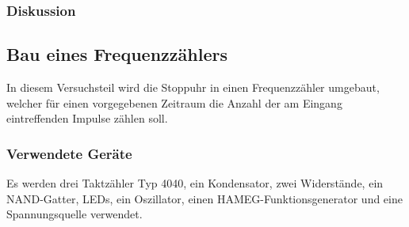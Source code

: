 \documentclass[12pt,a4paper]{article}
\begin{document}
\subsubsection*{Diskussion}





\subsection{Bau eines Frequenzzählers}
In diesem Versuchsteil wird die Stoppuhr in einen Frequenzzähler umgebaut, welcher für einen vorgegebenen Zeitraum die Anzahl der am Eingang eintreffenden Impulse zählen soll.
\subsubsection*{Verwendete Geräte}
Es werden drei Taktzähler Typ 4040, ein Kondensator, zwei Widerstände, ein NAND-Gatter, LEDs, ein Oszillator, einen HAMEG-Funktionsgenerator und eine Spannungsquelle verwendet.
\end{document}

